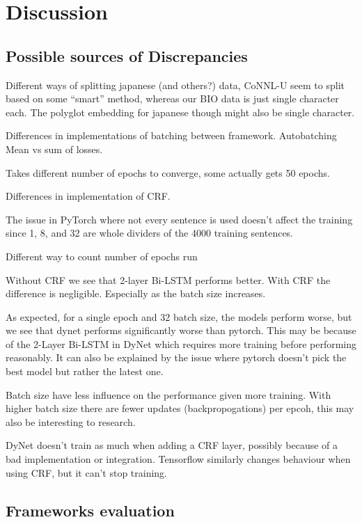 
\section{Discussion}

\subsection{Possible sources of Discrepancies}

Different ways of splitting japanese (and others?) data, CoNNL-U seem to split
based on some ``smart'' method, whereas our BIO data is just single character
each. The polyglot embedding for japanese though might also be single character.

Differences in implementations of batching between framework. Autobatching
Mean vs sum of losses.

Takes different number of epochs to converge, some actually gets 50 epochs.

Differences in implementation of CRF.

The issue in PyTorch where not every sentence is used doesn't affect the
training since 1, 8, and 32 are whole dividers of the 4000 training sentences.

Different way to count number of epochs run

Without CRF we see that 2-layer Bi-LSTM performs better. With CRF the difference is negligible.
Especially as the batch size increases.

As expected, for a single epoch and 32 batch size, the models perform worse, 
but we see that dynet performs significantly worse than pytorch. This may be 
because of the 2-Layer Bi-LSTM in DyNet which requires more training before 
performing reasonably. It can also be explained by the issue where pytorch
doesn't pick the best model but rather the latest one.

Batch size have less influence on the performance given more training.
With higher batch size there are fewer updates (backpropogations) per epcoh,
this may also be interesting to research.

DyNet doesn't train as much when adding a CRF layer, possibly because of a bad
implementation or integration. Tensorflow similarly changes behaviour when using
CRF, but it can't stop training.

\subsection{Frameworks evaluation}
\label{subsec:frameworks}

